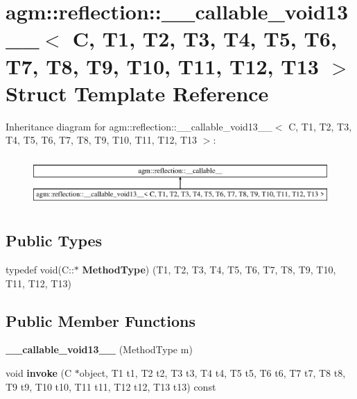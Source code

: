 \hypertarget{structagm_1_1reflection_1_1____callable__void13____}{}\section{agm\+:\+:reflection\+:\+:\+\_\+\+\_\+callable\+\_\+void13\+\_\+\+\_\+$<$ C, T1, T2, T3, T4, T5, T6, T7, T8, T9, T10, T11, T12, T13 $>$ Struct Template Reference}
\label{structagm_1_1reflection_1_1____callable__void13____}
Inheritance diagram for agm\+:\+:reflection\+:\+:\+\_\+\+\_\+callable\+\_\+void13\+\_\+\+\_\+$<$ C, T1, T2, T3, T4, T5, T6, T7, T8, T9, T10, T11, T12, T13 $>$\+:\begin{figure}[H]
\begin{center}
\leavevmode
\includegraphics[height=1.914530cm]{structagm_1_1reflection_1_1____callable__void13____}
\end{center}
\end{figure}
\subsection*{Public Types}
\begin{DoxyCompactItemize}
\item 
typedef void(C\+::$\ast$ {\bfseries Method\+Type}) (T1, T2, T3, T4, T5, T6, T7, T8, T9, T10, T11, T12, T13)\hypertarget{structagm_1_1reflection_1_1____callable__void13_____a604ef6a40d17c72b581875aa7bb05da5}{}\label{structagm_1_1reflection_1_1____callable__void13_____a604ef6a40d17c72b581875aa7bb05da5}

\end{DoxyCompactItemize}
\subsection*{Public Member Functions}
\begin{DoxyCompactItemize}
\item 
{\bfseries \+\_\+\+\_\+callable\+\_\+void13\+\_\+\+\_\+} (Method\+Type m)\hypertarget{structagm_1_1reflection_1_1____callable__void13_____a4e316dd734d6dcc9fc16230e6b32184e}{}\label{structagm_1_1reflection_1_1____callable__void13_____a4e316dd734d6dcc9fc16230e6b32184e}

\item 
void {\bfseries invoke} (C $\ast$object, T1 t1, T2 t2, T3 t3, T4 t4, T5 t5, T6 t6, T7 t7, T8 t8, T9 t9, T10 t10, T11 t11, T12 t12, T13 t13) const \hypertarget{structagm_1_1reflection_1_1____callable__void13_____a0ce2f91565b49099821c529b3a486a49}{}\label{structagm_1_1reflection_1_1____callable__void13_____a0ce2f91565b49099821c529b3a486a49}

\end{DoxyCompactItemize}
